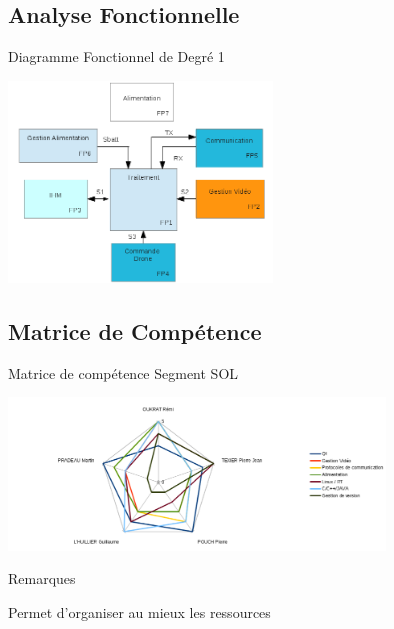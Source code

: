 \documentclass[11pt]{beamer}
\begin{document}
	
	
	\subsection{Analyse Fonctionnelle}
	\begin{frame}{Diagramme Fonctionnel de Degré 1}
	\begin{center}
		\includegraphics[width=7cm]{common/fonc.png}
	\end{center}
	\end{frame}
	
	\subsection{Matrice de Compétence}
	\begin{frame}{Matrice de compétence Segment SOL}
		\begin{center}
			\includegraphics[width=10cm]{common/matrice.png}
		\end{center}
			\begin{block}{Remarques}
			
			    \centering Permet d'organiser au mieux les ressources
			  
			\end{block}
	\end{frame}
	
	
\end{document}
